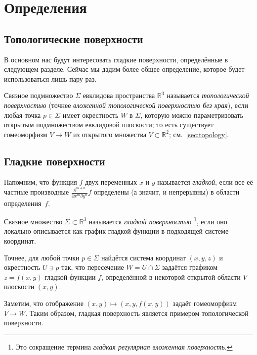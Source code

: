 \chapter{Определения}
\label{chap:surfaces-def}

\section{Топологические поверхности}

В основном нас будут интересовать гладкие поверхности, определённые в следующем разделе.
Сейчас мы дадим более общее определение, которое будет использоваться лишь пару раз.

Связное подмножество $\Sigma$ евклидова пространства $\mathbb{R}^3$
называется \emph{топологической поверхностью} (точнее {}\emph{вложенной топологической поверхностью без края}),
если любая точка $p\in \Sigma$ имеет окрестность $W$ в $\Sigma$,
которую можно параметризовать открытым подмножеством евклидовой плоскости;
то есть существует гомеоморфизм $V\to W$ из открытого множества $V\subset \mathbb{R}^2$; см.~\ref{sec:topology}.

\section{Гладкие поверхности}\label{sec:def-smooth-surface}

Напомним, что функция $f$ двух переменных $x$ и $y$ называется \emph{гладкой}, если все её частные производные $\frac{\partial^{m+n}}{\partial x^m\partial y^n}f$ определены (а значит, и непрерывны) в области определения~$f$.

{\sloppy

Связное множество $\Sigma \subset \mathbb{R}^3$ называется \emph{гладкой поверхностью}%
\footnote{Это сокращение термина {}\emph{гладкая регулярная вложенная поверхность}.}, если оно локально описывается как график гладкой функции в подходящей системе координат.

Точнее, для любой точки $p\in \Sigma$ найдётся система координат $(x,y,z)$ и окрестность $U\ni p$ так, что
пересечение $W=U\cap \Sigma$ задаётся графиком $z=f(x,y)$ гладкой функции $f$, определённой в некоторой открытой области $V$ плоскости $(x,y)$.

}

Заметим, что отображение $(x,y)\mapsto (x,y,f(x,y))$ задаёт гомеоморфизм $V\to W$.
Таким образом, гладкая поверхность является примером топологической поверхности.


